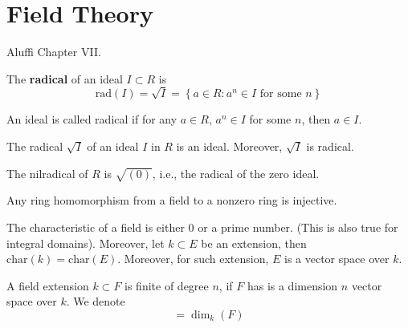 \documentclass[openany]{book}
\newcommand{\rad}{\text{rad}}
\begin{document}
\chapter{Field Theory}

Aluffi Chapter VII. 


\begin{defn}[radical]
    The \textbf{radical} of an ideal $I\subset R$ is 
    \begin{equation*}
        \rad(I)=\sqrt{I}=\left\{a\in R: a^n\in I \text{ for some $n$}\right\}
    \end{equation*}

    An ideal is called radical if for any $a\in R$, $a^n\in I$ for some $n$, then $a\in I$.
\end{defn}


\begin{prop}
    The radical $\sqrt{I}$ of an ideal $I$ in $R$ is an ideal. Moreover, $\sqrt{I}$ is radical.
\end{prop}

\begin{example}
    The nilradical of $R$ is $\sqrt{(0)}$, i.e., the radical of the zero ideal.
\end{example}








\begin{prop}
    Any ring homomorphism from a field to a nonzero ring is injective.
\end{prop}


\begin{prop}
    The characteristic of a field is either $0$ or a prime number. (This is also true for integral domains). Moreover, let $k\subset E$ be an extension, then $\text{char}(k)=\text{char}(E)$. Moreover, for such extension, $E$ is a vector space over $k$. 
\end{prop}







\begin{defn}
    A field extension $k\subset F$ is finite of degree $n$, if $F$ has is a dimension $n$ vector space over $k$. We denote 
    \begin{equation*}
        [F:k]=\dim_k(F)
    \end{equation*}
\end{defn}
\end{document}
